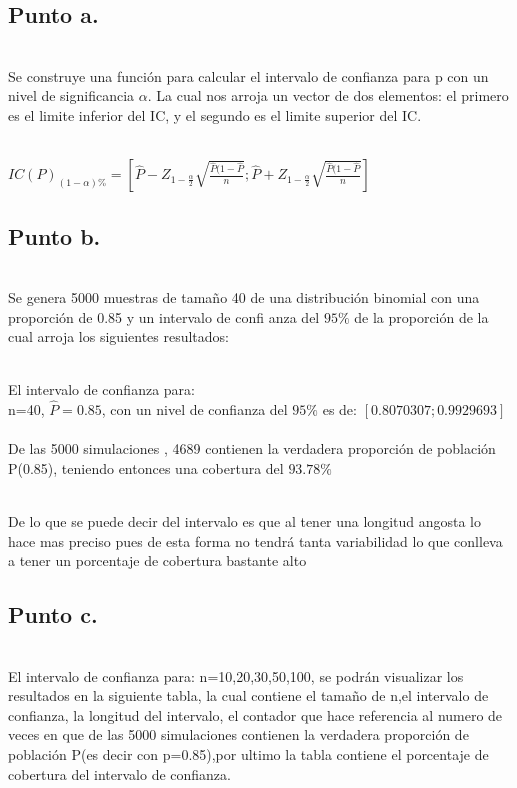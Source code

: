\documentclass[letterpaper,12pt,onecolumn,titlepage]{article}
\begin{document}
\subsection{Punto a.}

~\\ Se construye una funci\'{o}n para calcular el intervalo de confianza para p con un nivel de significancia $\alpha$. La cual nos arroja un vector de dos elementos: el primero es el limite inferior del IC, y el segundo es el limite superior del IC.

~\\ $IC(P)_{(1-\alpha)\%}=\left[\hat{P}-Z_{1-\frac{\alpha}{2}}\sqrt{\frac{\hat{P}(1-\hat{P}}{n}};\hat{P}+Z_{1-\frac{\alpha}{2}}\sqrt{\frac{\hat{P}(1-\hat{P}}{n}}\right]$


\subsection{Punto b.}

~\\Se genera 5000 muestras de tama\~{n}o 40 de una distribuci\'{o}n binomial con una proporci\'{o}n de 0.85 y un intervalo de confi 
anza del $95\%$ de la proporci\'{o}n de la cual arroja los siguientes resultados:


~\\El intervalo de confianza para:
~\\ n=40, $\hat{P}=0.85$, con un nivel de confianza del $95\%$ es de: $[0.8070307 ;0.9929693 ]$
~\\ De las 5000 simulaciones , 4689 contienen la verdadera proporci\'{o}n de poblaci\'{o}n P(0.85), teniendo entonces una cobertura del $93.78\%$

~\\De lo que se puede decir del intervalo es que al tener una longitud angosta lo hace mas preciso pues de esta forma no tendr\'{a} tanta variabilidad lo que conlleva a tener un porcentaje de cobertura bastante alto


\subsection{Punto c.}

~\\El intervalo de confianza para: n=10,20,30,50,100, se podr\'{a}n visualizar los resultados en la siguiente tabla, la cual contiene el tama\~{n}o de n,el intervalo de confianza, la longitud del intervalo, el contador que hace referencia al numero de veces en que de las 5000 simulaciones contienen la verdadera proporci\'{o}n de poblaci\'{o}n P(es decir con p=0.85),por ultimo la tabla contiene el porcentaje de cobertura del intervalo de confianza.
\end{document}
